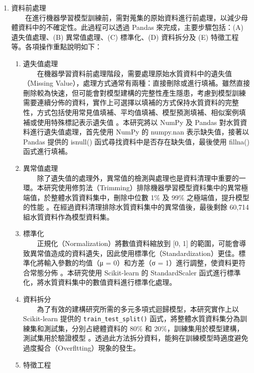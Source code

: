 \documentclass[12pt,a4paper]{article}
\begin{document}
\begin{enumerate}
\begin{enumerate}[label=\arabic*.]
\begin{enumerate}[label=2-2-\arabic*.]
\begin{figure}[H]
                \label{fig:correlation_matrix}
            \end{figure}
        \item 資料前處理\\
        　　在進行機器學習模型訓練前，需對蒐集的原始資料進行前處理，以減少母體資料中的不確定性。此過程可以透過 Pandas 來完成，主要步驟包括：(A) 遺失值處理、(B) 異常值處理、(C) 標準化、(D) 資料拆分及 (E) 特徵工程等。各項操作重點說明如下：
            \begin{enumerate}[label=\Alph*.]
                \item 遺失值處理\\
                　　在機器學習資料前處理階段，需要處理原始水質資料中的遺失值（Missing Value），處理方式通常有兩種：直接刪除或進行填補。雖然直接刪除較為快速，但可能會對模型建構的完整性產生隱患，考慮到模型訓練需要連續分佈的資料，實作上可選擇以填補的方式保持水質資料的完整性，方式包括使用常見值填補、平均值填補、模型預測填補、相似案例填補或使用特殊標記表示遺失值 \cite{ref24}。本研究將以 NumPy 及 Pandas 對水質資料進行遺失值處理，首先使用 NumPy 的 numpy.nan 表示缺失值，接著以 Pandas 提供的 isnull() 函式尋找資料中是否存在缺失值，最後使用 fillna() 函式進行填補。
                \item 異常值處理\\
                　　除了遺失值的處理外，異常值的檢測與處理也是資料清理中重要的一環。本研究使用修剪法（Trimming）排除機器學習模型資料集中的異常極端值，於整體水質資料集中，刪除中位數 1\% 及 99\% 之極端值，提升模型的性能 \cite{ref25}。在經過資料清理排除水質資料集中的異常值後，最後剩餘 60,714 組水質資料作為模型資料集。
                \item 標準化\\
                　　正規化（Normalization）將數值資料縮放到 [0, 1] 的範圍，可能會導致異常值造成的資料遺失，因此使用標準化（Standardization）更佳。標準化將輸入參數的均值（μ = 0）和方差（σ = 1）進行調整，使資料更符合常態分佈 \cite{ref26}。本研究使用 Scikit-learn 的 StandardScaler 函式進行標準化，將水質資料集中的數值資料進行標準化處理。
                \item 資料拆分\\
                　　為了有效的建構研究所需的多元多項式迴歸模型，本研究實作上以 Scikit-learn 提供的 \texttt{train\_test\_split()} 函式，將整體水質資料集分為訓練集和測試集，分別占總體資料的 80\% 和 20\%，訓練集用於模型建構，測試集用於驗證模型 \cite{ref27}。透過此方法拆分資料，能夠在訓練模型時適度避免過度擬合（Overfltting）現象的發生。
                \item 特徵工程\\

\end{enumerate}
\end{enumerate}
\end{enumerate}
\end{enumerate}
\end{document}
